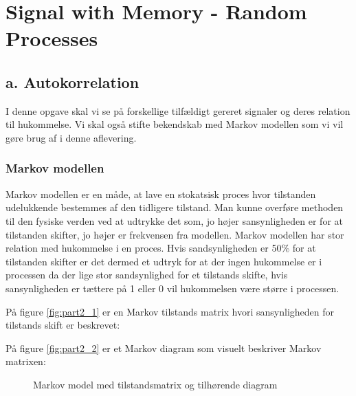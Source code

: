 \chapter{Signal with Memory - Random Processes}
\label{ch:part2}

\section{a. Autokorrelation}
I denne opgave skal vi se på forskellige tilfældigt gereret signaler og deres relation til hukommelse. Vi skal også stifte bekendskab med Markov modellen som vi vil gøre brug af i denne aflevering.\\
\subsection{Markov modellen}
Markov modellen er en måde, at lave en stokatsisk proces hvor tilstanden udelukkende bestemmes af den tidligere tilstand. Man kunne overføre methoden til den fysiske verden ved at udtrykke det som, jo højer sansynligheden er for at tilstanden skifter, jo højer er frekvensen fra modellen. Markov modellen har stor relation med hukommelse i en proces. Hvis sandsynligheden er 50$\%$ for at tilstanden skifter er det dermed et udtryk for at der ingen hukommelse er i processen da der lige stor sandsynlighed for et tilstands skifte, hvis sansynligheden er tættere på 1 eller 0 vil hukommelsen være større i processen. 

 På figure \ref{fig:part2_1} er en Markov tilstands matrix hvori sansynligheden for tilstands skift er beskrevet:  

På figure \ref{fig:part2_2} er et Markov diagram som visuelt beskriver Markov matrixen:

 \begin{figure}[!h]
	\centering
	\caption{Markov model med tilstandsmatrix og tilhørende diagram}
	\label{fig:part2_markov}
\end{figure}
 

